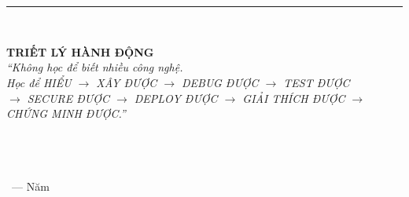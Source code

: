 
\begin{titlepage}
\centering
\vspace*{1.5cm}

{\Huge\bfseries\color{primarycolor} \booktitle}\\[0.6cm]
{\Large\color{secondarycolor} \booksubtitle}\\[1.5cm]

\rule{0.8\textwidth}{1.8pt}\\[1.5cm]

\begin{tcolorbox}[
  enhanced,
  colback=boxbg,
  colframe=primarycolor,
  width=0.88\textwidth,
  arc=3pt,
  boxrule=1pt,
  halign=center
]
\vspace{0.3cm}
{\large\bfseries\color{primarycolor} TRIẾT LÝ HÀNH ĐỘNG}\\[0.3cm]
\itshape\color{darktext}
``Không học để biết nhiều công nghệ.\\
Học để HIỂU $\rightarrow$ XÂY ĐƯỢC $\rightarrow$ DEBUG ĐƯỢC $\rightarrow$ TEST ĐƯỢC\\
$\rightarrow$ SECURE ĐƯỢC $\rightarrow$ DEPLOY ĐƯỢC $\rightarrow$ GIẢI THÍCH ĐƯỢC $\rightarrow$ CHỨNG MINH ĐƯỢC.''
\vspace{0.3cm}
\end{tcolorbox}

\vfill

{\large\textbf{\color{primarycolor} \bookauthor}}\\[0.2cm]
{\small\color{codegray} \bookedition}\\[0.4cm]
{\small\color{codegray} \bookpublisher}\\[0.2cm]
{\footnotesize\color{codegray} \booklocation\ --- Năm \bookyear}

\vspace*{1.0cm}
\end{titlepage}

